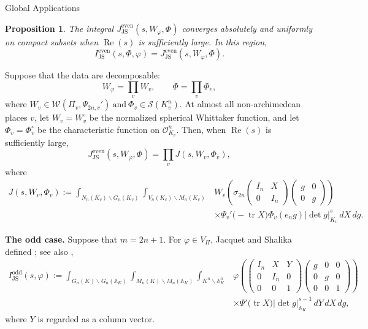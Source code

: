 \documentclass[12pt,reqno]{amsart}
\numberwithin{equation}{section}%
\numberwithin{equation}{subsection}
\newtheorem{prop}[equation]{Proposition}
\theoremstyle{definition}
\theoremstyle{remark}
\begin{document}
\begin{section}{Global Applications}
\begin{prop}\label{prop:global-js-even-unfolding}
The integral
\(J_{\mathrm{JS}}^{\mathrm{even}}(s,W_\varphi,\Phi)\)
converges absolutely and uniformly on compact subsets when
\(\operatorname{Re}(s)\) is sufficiently large. In this region,
\[
  I_{\mathrm{JS}}^{\mathrm{even}}(s,\Phi,\varphi)
  =
  J_{\mathrm{JS}}^{\mathrm{even}}(s,W_\varphi,\Phi).
\]
\end{prop}

Suppose that the data are decomposable:
\[
  W_\varphi=\prod_v W_v,
  \qquad
  \Phi=\prod_v\Phi_v,
\]
where $ W_v\in\mathcal{W}(\Pi_v,\Psi_{2n,v}')
  \>\text{and}\>
  \Phi_v\in\mathcal{S}(K_v^n).
$
At almost all non-archimedean places \(v\), let \(W_v=W_v^\circ\)
be the normalized spherical Whittaker function, and let  $\Phi_v=\Phi_v^\circ$
be the characteristic function on $\mathcal{O}_{K_v}^n$.
Then, when \(\operatorname{Re}(s)\) is sufficiently large,
\[
  J_{\mathrm{JS}}^{\mathrm{even}}(s,W_\varphi,\Phi)
  =
  \prod_v
  J(s,W_v,\Phi_v),
\]
where
\[
\begin{split}
  J(s,W_v,\Phi_v)
  :=
  \int_{N_n(K_v)\backslash G_n(K_v)}
  \int_{V_n(K_v)\backslash M_n(K_v)}
  &W_v\left(
    \sigma_{2n}
    \begin{pmatrix}
      I_n & X\\
      0   & I_n
    \end{pmatrix}
    \begin{pmatrix}
      g & 0\\
      0 & g
    \end{pmatrix}
  \right)                                                     \\
  &\times
  \Psi_v'\bigl(-\operatorname{tr}X\bigr)
  \Phi_v(e_ng)
  |\det g|_{K_v}^{s}\,dX\,dg.
\end{split}
\]

\medskip
\noindent\textbf{The odd case.}
Suppose that \(m=2n+1\). For \(\varphi\in V_\Pi\), Jacquet and
Shalika defined
\cite{JS1990}; see also \cite[Section~6]{Bel2011},
\[
\begin{split}
  I_{\mathrm{JS}}^{\mathrm{odd}}(s,\varphi)
  :=
  \int_{G_n(K)\backslash G_n(\mathbb{A}_K)}
  \int_{M_n(K)\backslash M_n(\mathbb{A}_K)}
  \int_{K^n\backslash\mathbb{A}_K^n}
  &\varphi\left(
    \begin{pmatrix}
      I_n & X   & Y\\
      0   & I_n & 0\\
      0   & 0   & 1
    \end{pmatrix}
    \begin{pmatrix}
      g & 0 & 0\\
      0 & g & 0\\
      0 & 0 & 1
    \end{pmatrix}
  \right)                                                     \\
  &\times
  \Psi'\bigl(\operatorname{tr}X\bigr)
  |\det g|_{\mathbb{A}_K}^{s-1}\,dY\,dX\,dg,
\end{split}
\]
where \(Y\) is regarded as a column vector.


\end{section}
\end{document}
